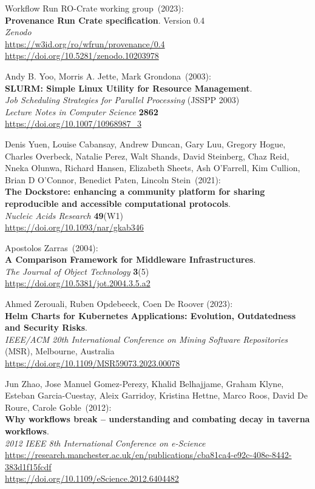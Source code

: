 \begin{thebibliography}{9}
Workflow Run RO-Crate working group~(2023): \\
\textbf{Provenance Run Crate specification}. Version 0.4\\
\emph{Zenodo}\\
\url{https://w3id.org/ro/wfrun/provenance/0.4}\\
\url{https://doi.org/10.5281/zenodo.10203978}

Andy B. Yoo, Morris A. Jette, Mark Grondona~(2003): \\
\textbf{SLURM: Simple Linux Utility for Resource Management}.\\
\emph{Job Scheduling Strategies for Parallel Processing} (JSSPP 2003)\\
\emph{Lecture Notes in Computer Science} \textbf{2862}\\
\url{https://doi.org/10.1007/10968987_3}

Denis Yuen, Louise Cabansay, Andrew Duncan, Gary Luu, Gregory Hogue, Charles Overbeck, Natalie Perez, Walt Shands, David Steinberg, Chaz Reid, Nneka Olunwa, Richard Hansen, Elizabeth Sheets, Ash O’Farrell, Kim Cullion, Brian D O’Connor, Benedict Paten, Lincoln Stein~(2021): \\
\textbf{The Dockstore: enhancing a community platform for sharing reproducible and accessible computational protocols}.\\
\emph{Nucleic Acids Research} \textbf{49}(W1) \\
\url{https://doi.org/10.1093/nar/gkab346}

Apostolos Zarras~(2004): \\
\textbf{A {Comparison Framework} for {Middleware Infrastructures}}. \\
\emph{The Journal of Object Technology} \textbf{3}(5) \\
\url{https://doi.org/10.5381/jot.2004.3.5.a2}

Ahmed Zerouali, Ruben Opdebeeck, Coen De Roover (2023):\\
\textbf{Helm Charts for Kubernetes Applications: Evolution, Outdatedness and Security Risks}.\\
\emph{IEEE/ACM 20th International Conference on Mining Software Repositories} (MSR), Melbourne, Australia \\
\url{https://doi.org/10.1109/MSR59073.2023.00078}

Jun Zhao, Jose Manuel Gomez-Perezy, Khalid Belhajjame, Graham Klyne, Esteban Garcia-Cuestay, Aleix Garridoy, Kristina Hettne, Marco Roos, David De Roure, Carole Goble~(2012): \\
\textbf{Why workflows break -- understanding and combating decay in taverna workflows}.\\
\emph{2012 IEEE 8th International Conference on e-Science}\\
\url{https://research.manchester.ac.uk/en/publications/cba81ca4-e92c-408e-8442-383d1f15fcdf}\\
\url{https://doi.org/10.1109/eScience.2012.6404482}


\end{thebibliography}
